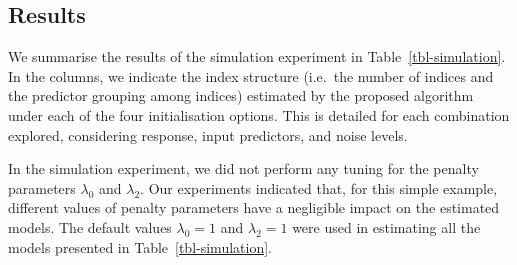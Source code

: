 \documentclass[
  11pt,
  a4paper,
]{article}
\begin{document}
\subsection{Results}\label{sec-sim-results}

We summarise the results of the simulation experiment in
Table~\ref{tbl-simulation}. In the columns, we indicate the index
structure (i.e.~the number of indices and the predictor grouping among
indices) estimated by the proposed algorithm under each of the four
initialisation options. This is detailed for each combination explored,
considering response, input predictors, and noise levels.

In the simulation experiment, we did not perform any tuning for the
penalty parameters \(\lambda_{0}\) and \(\lambda_{2}\). Our experiments
indicated that, for this simple example, different values of penalty
parameters have a negligible impact on the estimated models. The default
values \(\lambda_{0} = 1\) and \(\lambda_{2} = 1\) were used in
estimating all the models presented in Table~\ref{tbl-simulation}.
\end{document}
